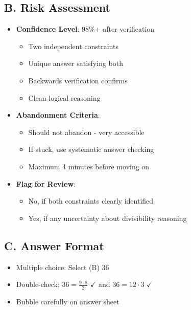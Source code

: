 \documentclass[12pt]{article}
\begin{document}
\begin{competitionbox}
\subsection*{B. Risk Assessment}
\begin{itemize}[leftmargin=*]
    \item \textbf{Confidence Level}: 98\%+ after verification
    \begin{itemize}
        \item Two independent constraints
        \item Unique answer satisfying both
        \item Backwards verification confirms
        \item Clean logical reasoning
    \end{itemize}
    \item \textbf{Abandonment Criteria}: 
    \begin{itemize}
        \item Should not abandon - very accessible
        \item If stuck, use systematic answer checking
        \item Maximum 4 minutes before moving on
    \end{itemize}
    \item \textbf{Flag for Review}: 
    \begin{itemize}
        \item No, if both constraints clearly identified
        \item Yes, if any uncertainty about divisibility reasoning
    \end{itemize}
\end{itemize}

\subsection*{C. Answer Format}
\begin{itemize}[leftmargin=*]
    \item Multiple choice: Select (B) 36
    \item Double-check: $36 = \frac{9 \cdot 8}{2}$ $\checkmark$ and $36 = 12 \cdot 3$ $\checkmark$
    \item Bubble carefully on answer sheet
\end{itemize}
\end{competitionbox}
\end{document}
